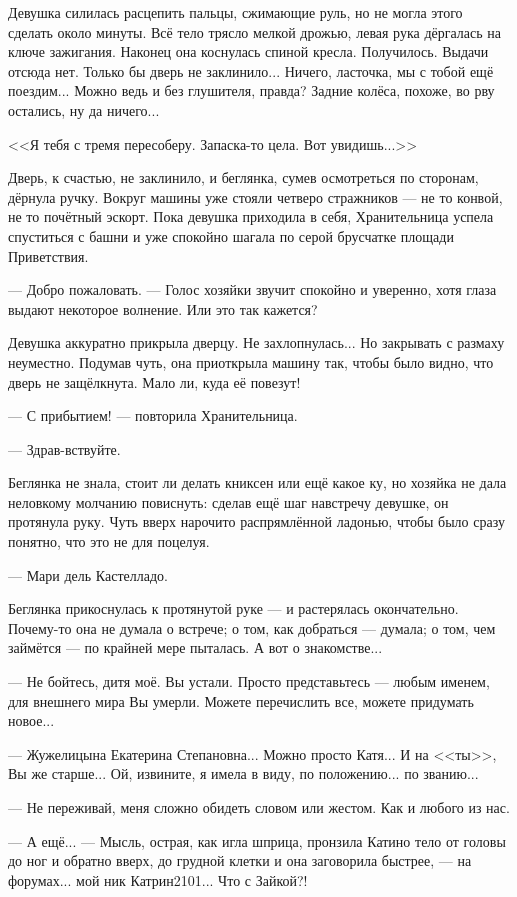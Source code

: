 Девушка силилась расцепить пальцы, сжимающие руль, но не могла этого сделать около минуты.
Всё тело трясло мелкой дрожью, левая рука дёргалась на ключе зажигания.
Наконец она коснулась спиной кресла. Получилось. Выдачи отсюда нет. Только бы дверь не заклинило...
Ничего, ласточка, мы с тобой ещё поездим... Можно ведь и без глушителя, правда?
Задние колёса, похоже, во рву остались, ну да ничего...

<<Я тебя с тремя пересоберу. Запаска-то цела. Вот увидишь...>>

Дверь, к счастью, не заклинило, и беглянка, сумев осмотреться по сторонам, дёрнула ручку.
Вокруг машины уже стояли четверо стражников --- не то конвой, не то почётный эскорт.
Пока девушка приходила в себя, Хранительница успела спуститься с башни
и уже спокойно шагала по серой брусчатке площади Приветствия.

--- Добро пожаловать. --- Голос хозяйки звучит спокойно и уверенно,
хотя глаза выдают некоторое волнение. Или это так кажется?

Девушка аккуратно прикрыла дверцу. Не захлопнулась... Но закрывать с размаху неуместно.
Подумав чуть, она приоткрыла машину так, чтобы было видно, что дверь не защёлкнута. Мало ли, куда её повезут!

--- С прибытием! --- повторила Хранительница.

--- Здрав-вствуйте.

Беглянка не знала, стоит ли делать книксен или ещё какое ку, но хозяйка не дала неловкому молчанию повиснуть:
сделав ещё шаг навстречу девушке, он протянула руку.
Чуть вверх нарочито распрямлённой ладонью, чтобы было сразу понятно, что это не для поцелуя.

--- Мари дель Кастелладо.

Беглянка прикоснулась к протянутой руке --- и растерялась окончательно. Почему-то она не думала о встрече;
о том, как добраться --- думала; о том, чем займётся --- по крайней мере пыталась. А вот о знакомстве...

--- Не бойтесь, дитя моё. Вы устали. Просто представьтесь --- любым именем, для внешнего мира Вы умерли.
Можете перечислить все, можете придумать новое...

--- Жужелицына Екатерина Степановна... Можно просто Катя... И на <<ты>>, Вы же старше...
Ой, извините, я имела в виду, по положению... по званию...

--- Не переживай, меня сложно обидеть словом или жестом. Как и любого из нас.

--- А ещё... --- Мысль, острая, как игла шприца, пронзила Катино тело от головы до ног и обратно вверх, до грудной клетки
 и она заговорила быстрее, --- на форумах... мой ник Катрин2101... Что с Зайкой?!

